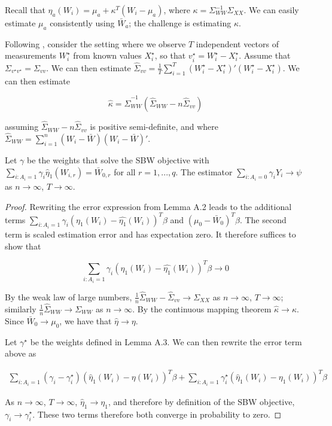 Recall that $\eta_a(W_i) = \mu_a + \kappa^T(W_i - \mu_a)$, where $\kappa = \Sigma_{WW}^{-1}\Sigma_{XX}$. We can easily estimate $\mu_a$ consistently using $\bar{W}_a$; the challenge is estimating $\kappa$. 

Following \cite{gleser1992importance}, consider the setting where we observe $T$ independent vectors of measurements $W_i^\star$ from known values $X_i^\star$, so that $v_i^\star = W_i^\star - X_i^\star$. Assume that $\Sigma_{v^\star v^\star} = \Sigma_{vv}$. We can then estimate $\hat{\Sigma}_{vv} = \frac{1}{T}\sum_{i=1}^T(W_i^\star - X_i^\star)'(W_i^\star - X_i^\star)$. We can then estimate

$$
\hat{\kappa} = \hat{\Sigma}_{WW}^{-1}(\hat{\Sigma}_{WW} - n\hat{\Sigma}_{vv})
$$

assuming $\hat{\Sigma}_{WW} - n\hat{\Sigma}_{vv}$ is positive semi-definite, and where $\hat{\Sigma}_{WW} = \sum_{i=1}^n (W_i - \bar{W})(W_i - \bar{W})'$. 

\begin{proposition}

Let $\gamma$ be the weights that solve the SBW objective with $\sum_{i: A_i = 1}\gamma_i\hat{\eta}_1(W_{i, r}) = \bar{W}_{0, r}$ for all $r = 1, ..., q$. The estimator $\sum_{i: A_i = 0}\gamma_iY_i \to \psi$ as $n \to \infty$, $T \to \infty$.

\end{proposition}

\begin{proof}

Rewriting the error expression from Lemma A.2 leads to the additional terms $\sum_{i: A_i = 1}\gamma_i(\eta_1(W_i) - \hat{\eta_1}(W_i))^T\beta$ and $(\mu_0 - \bar{W}_0)^T\beta$. The second term is scaled estimation error and has expectation zero. It therefore suffices to show that 

$$
\sum_{i: A_i = 1}\gamma_i(\eta_1(W_i) - \hat{\eta_1}(W_i))^T\beta \to 0
$$

By the weak law of large numbers, $\frac{1}{n}\hat{\Sigma}_{WW} - \hat{\Sigma}_{vv} \to \Sigma_{XX}$ as $n \to \infty$, $T \to \infty$; similarly $\frac{1}{n}\hat{\Sigma}_{WW} \to \Sigma_{WW}$ as $n \to \infty$. By the continuous mapping theorem $\hat{\kappa} \to \kappa$. Since $\bar{W}_0 \to \mu_0$, we have that $\hat{\eta} \to \eta$. 

Let $\gamma^\star$ be the weights defined in Lemma A.3. We can then rewrite the error term above as

\begin{align*}
\sum_{i: A_i = 1}(\gamma_i - \gamma_i^\star)(\hat{\eta}_1(W_i) - \eta(W_i))^T\beta + \sum_{i: A_i = 1}\gamma_i^\star(\hat{\eta}_1(W_i) - \eta_1(W_i))^T\beta
\end{align*}

As $n \to \infty$, $T \to \infty$, $\hat{\eta}_1 \to \eta_1$, and therefore by definition of the SBW objective, $\gamma_i \to \gamma_i^\star$. These two terms therefore both converge in probability to zero. 

\end{proof}

